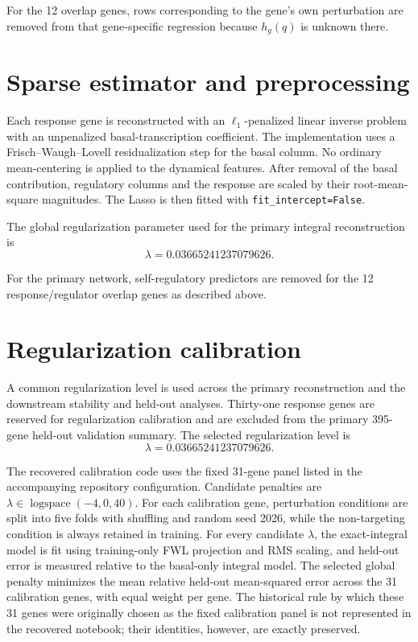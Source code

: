 \documentclass[supplement,onefignum,onetabnum]{siamart251216}
\begin{document}
For the 12 overlap genes, rows corresponding to the gene's own perturbation are removed from that gene-specific regression because \(h_g(q)\) is unknown there.

\section{Sparse estimator and preprocessing}

Each response gene is reconstructed with an \(\ell_1\)-penalized linear inverse problem with an unpenalized basal-transcription coefficient. The implementation uses a Frisch--Waugh--Lovell residualization step for the basal column. No ordinary mean-centering is applied to the dynamical features. After removal of the basal contribution, regulatory columns and the response are scaled by their root-mean-square magnitudes. The Lasso is then fitted with \texttt{fit\_intercept=False}.

The global regularization parameter used for the primary integral reconstruction is
\[
\lambda=0.03665241237079626.
\]

For the primary network, self-regulatory predictors are removed for the 12 response/regulator overlap genes as described above.

\section{Regularization calibration}

A common regularization level is used across the primary reconstruction and the downstream stability and held-out analyses. Thirty-one response genes are reserved for regularization calibration and are excluded from the primary 395-gene held-out validation summary. The selected regularization level is
\[
\lambda=0.03665241237079626.
\]

The recovered calibration code uses the fixed 31-gene panel listed in the accompanying repository configuration. Candidate penalties are \(\lambda\in\operatorname{logspace}(-4,0,40)\). For each calibration gene, perturbation conditions are split into five folds with shuffling and random seed 2026, while the non-targeting condition is always retained in training. For every candidate \(\lambda\), the exact-integral model is fit using training-only FWL projection and RMS scaling, and held-out error is measured relative to the basal-only integral model. The selected global penalty minimizes the mean relative held-out mean-squared error across the 31 calibration genes, with equal weight per gene. The historical rule by which these 31 genes were originally chosen as the fixed calibration panel is not represented in the recovered notebook; their identities, however, are exactly preserved.
\end{document}
